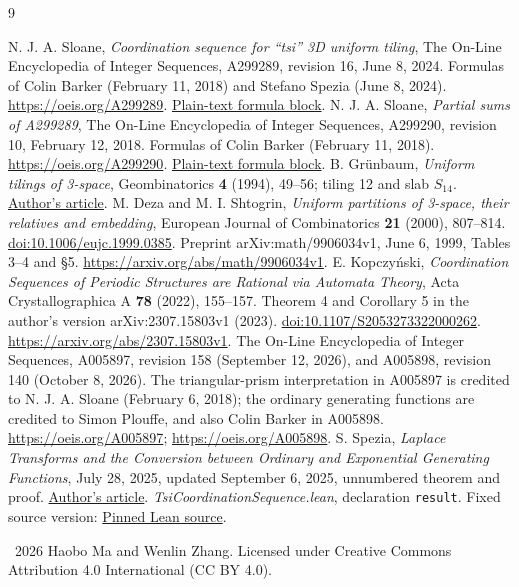 \documentclass[10pt]{article}
\begin{document}
\begin{thebibliography}{9}
\raggedright
{}
N. J. A. Sloane, \emph{Coordination sequence for ``tsi'' 3D uniform tiling},
The On-Line Encyclopedia of Integer Sequences, A299289, revision 16,
June 8, 2024. Formulas of Colin Barker (February 11, 2018) and
Stefano Spezia (June 8, 2024).
\url{https://oeis.org/A299289}.
\href{https://oeis.org/search?q=id:A299289\&fmt=text}{Plain-text formula block}.
N. J. A. Sloane, \emph{Partial sums of A299289},
The On-Line Encyclopedia of Integer Sequences, A299290, revision 10,
February 12, 2018. Formulas of Colin Barker (February 11, 2018).
\url{https://oeis.org/A299290}.
\href{https://oeis.org/search?q=id:A299290\&fmt=text}{Plain-text formula block}.
B. Gr\"unbaum, \emph{Uniform tilings of 3-space},
Geombinatorics \textbf{4} (1994), 49--56; tiling 12 and slab $S_{14}$.
\href{https://faculty.washington.edu/moishe/branko/BG199.Uniform\%20Tilings\%20of\%203-Space.pdf}{Author's article}.
M. Deza and M. I. Shtogrin, \emph{Uniform partitions of 3-space,
their relatives and embedding}, European Journal of Combinatorics
\textbf{21} (2000), 807--814.
\href{https://doi.org/10.1006/eujc.1999.0385}{doi:10.1006/eujc.1999.0385}.
Preprint arXiv:math/9906034v1, June 6, 1999, Tables 3--4 and \S5.
\url{https://arxiv.org/abs/math/9906034v1}.
E. Kopczy\'nski, \emph{Coordination Sequences of Periodic Structures
are Rational via Automata Theory}, Acta Crystallographica A
\textbf{78} (2022), 155--157. Theorem 4 and Corollary 5 in the
author's version arXiv:2307.15803v1 (2023).
\href{https://doi.org/10.1107/S2053273322000262}{doi:10.1107/S2053273322000262}.
\url{https://arxiv.org/abs/2307.15803v1}.
The On-Line Encyclopedia of Integer Sequences, A005897, revision 158
(September 12, 2026), and A005898, revision 140 (October 8, 2026).
The triangular-prism interpretation in A005897 is credited to
N. J. A. Sloane (February 6, 2018); the ordinary generating functions
are credited to Simon Plouffe, and also Colin Barker in A005898.
\url{https://oeis.org/A005897}; \url{https://oeis.org/A005898}.
S. Spezia, \emph{Laplace Transforms and the Conversion between Ordinary
and Exponential Generating Functions}, July 28, 2025, updated
September 6, 2025, unnumbered theorem and proof.
\href{https://stefanospezia.altervista.org/laplace-transforms-and-the-conversion-between-ordinary-and-exponential-generating-functions/}{Author's article}.
\emph{TsiCoordinationSequence.lean}, declaration \texttt{result}.
Fixed source version:
\href{https://github.com/the-omega-institute/trureturing/blob/6974dba01daa1a25cc74b87a86c191e95fe2c681/D5/S3/StatisticalMechanics/TsiCoordinationSequence.lean}{Pinned Lean source}.
\end{thebibliography}
\smallskip
\noindent\small\textcopyright\ 2026 Haobo Ma and Wenlin Zhang.
Licensed under Creative Commons Attribution 4.0 International (CC BY 4.0).
\end{document}

